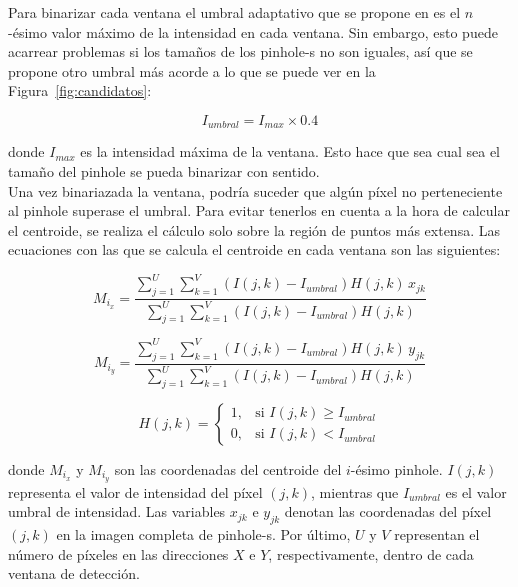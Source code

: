 \documentclass[12pt]{article}
\numberwithin{equation}{section}%
\newcommand{\lightit}[1]{{\lightitfont #1}}
\begin{document}
\newpage
Para binarizar cada ventana el umbral adaptativo que se propone en \cite{Yin2010Centroid} es el \(n\)-ésimo valor máximo de la intensidad en cada ventana. Sin embargo, esto puede acarrear problemas si los tamaños de los \lightit{pinhole}-s no son iguales, así que se propone otro umbral más acorde a lo que se puede ver en la Figura\ \ref{fig:candidatos}:

\begin{equation}
    I_{umbral}=I_{max} \times 0.4
    \label{eq:umbral_adaptativo}
\end{equation}

donde \(I_{max}\) es la intensidad máxima de la ventana. Esto hace que sea cual sea el tamaño del \lightit{pinhole} se pueda binarizar con sentido.\\

Una vez binariazada la ventana, podría suceder que algún píxel no perteneciente al \lightit{pinhole} superase el umbral. Para evitar tenerlos en cuenta a la hora de calcular el centroide, se realiza el cálculo solo sobre la región de puntos más extensa. Las ecuaciones con las que se calcula el centroide en cada ventana son las siguientes:

\begin{equation*}
M_{i_x} =
\frac{
\displaystyle \sum_{j=1}^{U} \sum_{k=1}^{V} \left( I(j,k) - I_{umbral} \right) H(j,k)\, x_{jk}
}{
\displaystyle \sum_{j=1}^{U} \sum_{k=1}^{V} \left( I(j,k) - I_{umbral} \right) H(j,k)
}
\label{eq:M_ix}
\end{equation*}

\begin{equation*}
M_{i_y} =
\frac{
\displaystyle \sum_{j=1}^{U} \sum_{k=1}^{V} \left( I(j,k) - I_{umbral} \right) H(j,k)\, y_{jk}
}{
\displaystyle \sum_{j=1}^{U} \sum_{k=1}^{V} \left( I(j,k) - I_{umbral} \right) H(j,k)
}
\label{eq:M_iy}
\end{equation*}

\begin{equation*}
H(j, k) =
\begin{cases}
1, & \text{si } I(j,k) \geq I_{umbral} \\
0, & \text{si } I(j,k) < I_{umbral}
\end{cases}
\label{eq:heaviside}
\end{equation*}

donde $M_{i_x}$ y $M_{i_y}$ son las coordenadas del centroide del \(i\)-ésimo \lightit{pinhole}. $I(j,k)$ representa el valor de intensidad del píxel $(j,k)$, mientras que $I_{umbral}$ es el valor umbral de intensidad. Las variables $x_{jk}$ e $y_{jk}$ denotan las coordenadas del píxel $(j,k)$ en la imagen completa de \lightit{pinhole}-s. Por último, $U$ y $V$ representan el número de píxeles en las direcciones $X$ e $Y$, respectivamente, dentro de cada ventana de detección.\\
\end{document}
